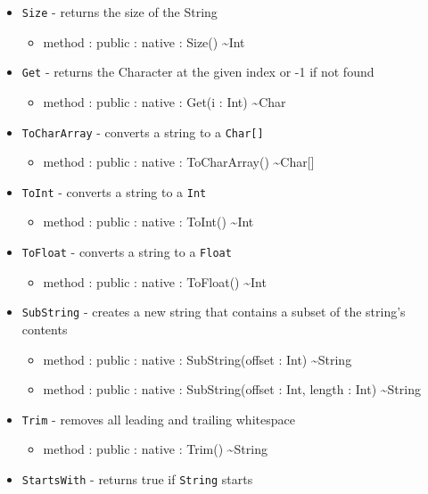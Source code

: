 \documentclass[12pt]{article}
\begin{document}
\begin{itemize}
\begin{itemize}
  \end{itemize}
\item \texttt{Size} - returns the size of the String
  \begin{itemize}
  \item method : public : native : Size() \textasciitilde Int
  \end{itemize}
\item \texttt{Get} - returns the Character at the given index or -1 if
  not found
  \begin{itemize}
  \item method : public : native : Get(i : Int) \textasciitilde Char
  \end{itemize}
\item \texttt{ToCharArray} - converts a string to a \texttt{Char[]}
  \begin{itemize}
  \item method : public : native : ToCharArray() \textasciitilde Char[]
  \end{itemize}
\item \texttt{ToInt} - converts a string to a \texttt{Int}
  \begin{itemize}
  \item method : public : native : ToInt() \textasciitilde Int
  \end{itemize}
\item \texttt{ToFloat} - converts a string to a \texttt{Float}
  \begin{itemize}
  \item method : public : native : ToFloat() \textasciitilde Int
  \end{itemize}
\item \texttt{SubString} - creates a new string that contains a subset
  of the string's contents
  \begin{itemize}
  \item method : public : native : SubString(offset : Int) \textasciitilde String
  \item method : public : native : SubString(offset : Int, length :
    Int) \textasciitilde String
  \end{itemize}
\item \texttt{Trim} - removes all leading and trailing whitespace
  \begin{itemize}
  \item method : public : native : Trim() \textasciitilde String
  \end{itemize}
\item \texttt{StartsWith} - returns true if \texttt{String} starts

\end{itemize}
\end{document}
